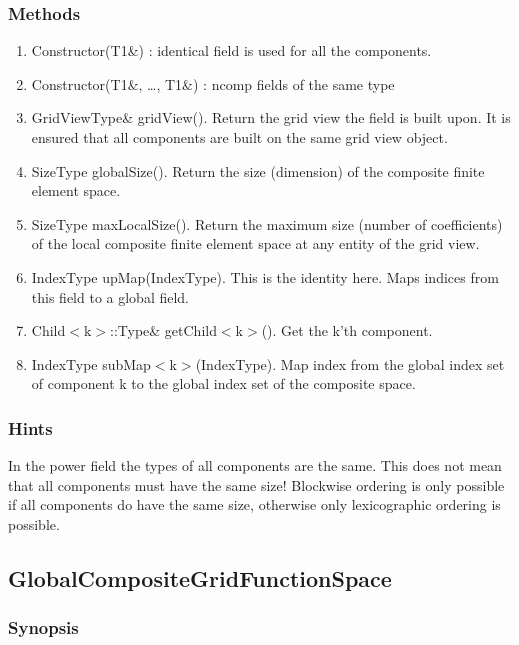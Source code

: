 \documentclass[11pt,a4paper,DIV11,%
notitlepage,oneside,abstracton,%
bibtotoc]{scrartcl}
\begin{document}
\subsubsection{Methods}

\begin{enumerate}[1)]
\item Constructor(T1\&) : identical field is used for all the components. 
\item Constructor(T1\&, \ldots , T1\&) : ncomp fields of the same type
\item GridViewType\& gridView(). Return the grid view 
  the field is built upon. It is ensured that all components are built
  on the same grid view object.
\item SizeType globalSize(). Return the size (dimension) of the
  composite finite element space.  
\item SizeType maxLocalSize(). Return the maximum size (number of
  coefficients) of the local composite finite element space at any entity of the
  grid view.
\item IndexType upMap(IndexType). This is the identity here. Maps
  indices from this field to a global field.
\item Child$<$k$>$::Type\& getChild$<$k$>$(). Get the k'th component.
\item IndexType subMap$<$k$>$(IndexType). Map index from the global
  index set of component k to the global index set of the composite space.
\end{enumerate}

\subsubsection{Hints}

In the power field the types of all components are the same. This does
not mean that all components must have the same size! Blockwise
ordering is only possible if all components do have the same size,
otherwise only lexicographic ordering is possible.

\subsection{GlobalCompositeGridFunctionSpace}

\subsubsection{Synopsis}
\end{document}
